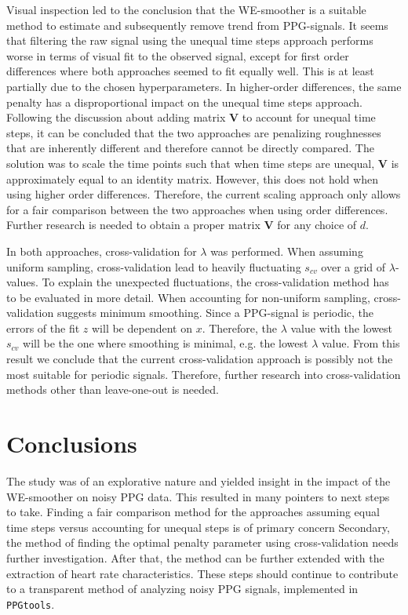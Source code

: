 \documentclass[twocolumn]{bmcart}%
\begin{document}
Visual inspection led to the conclusion that the WE-smoother is a suitable method to estimate and subsequently remove trend from PPG-signals. 
It seems that filtering the raw signal using the unequal time steps approach performs worse in terms of visual fit to the observed signal, except for first order differences where both approaches seemed to fit equally well. 
This is at least partially due to the chosen hyperparameters. 
In higher-order differences, the same penalty has a disproportional impact on the unequal time steps approach.
Following the discussion about adding matrix $\mathbf{V}$ to account for unequal time steps, it can be concluded that the two approaches are penalizing roughnesses that are inherently different and therefore cannot be directly compared. 
The solution was to scale the time points such that when time steps are unequal, $\mathbf{V}$ is approximately equal to an identity matrix.
However, this does not hold when using higher order differences. 
Therefore, the current scaling approach only allows for a fair comparison between the two approaches when using order differences. 
Further research is needed to obtain a proper matrix $\mathbf{V}$ for any choice of $d$. 

In both approaches, cross-validation for $\lambda$ was performed. 
When assuming uniform sampling, cross-validation lead to heavily fluctuating $s_{cv}$ over a grid of $\lambda$-values.
To explain the unexpected fluctuations, the cross-validation method has to be evaluated in more detail. 
When accounting for non-uniform sampling, cross-validation suggests minimum smoothing. 
Since a PPG-signal is periodic, the errors of the fit $z$ will be dependent on $x$. 
Therefore, the $\lambda$ value with the lowest $s_{cv}$ will be the one where smoothing is minimal, e.g. the lowest $\lambda$ value. 
From this result we conclude that the current cross-validation approach is possibly not the most suitable for periodic signals.
Therefore, further research into cross-validation methods other than leave-one-out is needed. 

\section*{Conclusions}
The study was of an explorative nature and yielded insight in the impact of the WE-smoother on noisy PPG data.
This resulted in many pointers to next steps to take. 
Finding a fair comparison method for the approaches assuming equal time steps versus accounting for unequal steps is of primary concern
Secondary, the method of finding the optimal penalty parameter using cross-validation needs further investigation. 
After that, the method can be further extended with the extraction of heart rate characteristics. 
These steps should continue to contribute to a transparent method of analyzing noisy PPG signals, implemented in \verb|PPGtools|. 
\end{document}
